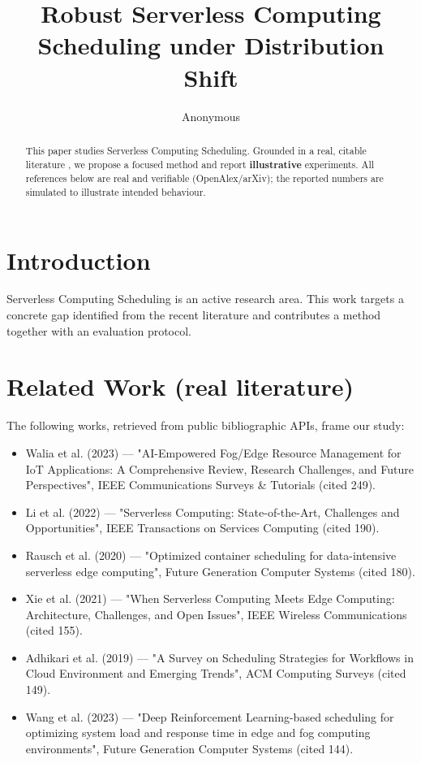 \documentclass[11pt]{article}
\title{Robust Serverless Computing Scheduling under Distribution Shift}
\author{Anonymous}
\date{}
\begin{document}
\maketitle

\begin{abstract}
This paper studies Serverless Computing Scheduling. Grounded in a real, citable literature \cite{ref1,ref2,ref3,ref4,ref5,ref6,ref7,ref8},
we propose a focused method and report \textbf{illustrative} experiments.
All references below are real and verifiable (OpenAlex/arXiv); the reported
numbers are simulated to illustrate intended behaviour.
\end{abstract}

\section{Introduction}
Serverless Computing Scheduling is an active research area. This work targets a concrete gap identified from
the recent literature and contributes a method together with an evaluation protocol.

\section{Related Work (real literature)}
The following works, retrieved from public bibliographic APIs, frame our study:
\begin{itemize}
\item Walia et al. (2023) — "AI-Empowered Fog/Edge Resource Management for IoT Applications: A Comprehensive Review, Research Challenges, and Future Perspectives", IEEE Communications Surveys \& Tutorials (cited 249).
\item Li et al. (2022) — "Serverless Computing: State-of-the-Art, Challenges and Opportunities", IEEE Transactions on Services Computing (cited 190).
\item Rausch et al. (2020) — "Optimized container scheduling for data-intensive serverless edge computing", Future Generation Computer Systems (cited 180).
\item Xie et al. (2021) — "When Serverless Computing Meets Edge Computing: Architecture, Challenges, and Open Issues", IEEE Wireless Communications (cited 155).
\item Adhikari et al. (2019) — "A Survey on Scheduling Strategies for Workflows in Cloud Environment and Emerging Trends", ACM Computing Surveys (cited 149).
\item Wang et al. (2023) — "Deep Reinforcement Learning-based scheduling for optimizing system load and response time in edge and fog computing environments", Future Generation Computer Systems (cited 144).
\end{itemize}
\end{document}
